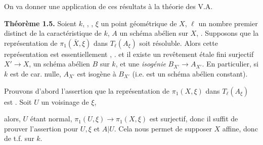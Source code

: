 \documentclass[11pt,a4paper]{article}
\begin{document}
On va donner une application de ces résultats à la théorie des V.A.

\textbf{Théorème 1.5.} Soient $k$, ,   , $\xi$ un point géométrique de $X$, \struck{\ill{}} $\ell$ un nombre premier distinct de la caractéristique de $k$, $A$ un schéma abélien sur $X$, . Supposons que la représentation de $\pi_1(\bar X, \xi)$ dans $T_\ell(A_\xi)$ soit   résoluble. Alors cette représentation est essentiellement  , .  et il existe un revêtement étale fini surjectif $X' \to X$,   \add{\ill{}} un schéma abélien $B$ sur $k$,  et une \emph{isogénie}  $B_{X'} \to A_{X'}$.  En particulier, si $k$ est de car. nulle, \struck{\ill{}} $A_{X'}$ est isogène à $B_{X'}$ (i.e. est un schéma abélien constant).

Prouvons d'abord l'assertion que la représentation de $\pi_1(X,\xi)$ dans $T_\ell(A_\xi)$ est  \struck{\ill{} \ill{}}.  Soit $U$ un voisinage \ill{} \ill{} \ill{} de $\xi$,


alors,  $U$ étant normal, $\pi_1(U,\xi) \to \pi_1(X,\xi)$ est surjectif, donc il  suffit de prouver l'assertion pour $U,\xi$ et $A|U$. Cela nous permet de supposer $X$ affine, donc de t.f. sur $k$.


\end{document}
